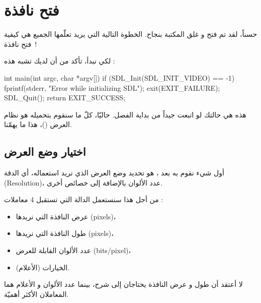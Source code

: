 \section{فتح نافذة}

حسناً، لقد تم فتح و غلق المكتبة بنجاح. الخطوة التالية التي يريد تعلّمها الجميع هي كيفية فتح نافذة~! 

لكي نبدأ، تأكد من أن لديك
تشبه هذه :

\begin{Csource}
int main(int argc, char *argv[])
{
	if (SDL_Init(SDL_INIT_VIDEO) == -1)
	{
		fprintf(stderr, "Error while initializing SDL");
		exit(EXIT_FAILURE);
	}
	SDL_Quit();
	return EXIT_SUCCESS;
}
\end{Csource}

هذه هي حالتك لو اتبعت جيداً من بداية الفصل. حاليّا، كلّ ما سنقوم بتحميله هو نظام العرض
()،
هذا ما يهمّنا.
\subsection{اختيار وضع العرض}

أول شيء نقوم به بعد 
،
هو تحديد وضع العرض الذي نريد استعماله، أي الدقة
(\textenglish{Resolution})،
عدد الألوان بالإضافة إلى خصائص أخرى.

من أجل هذا سنستعمل الدالة
التي تستقبل 4 معاملات :

\begin{itemize}
	\item عرض النافذة التي نريدها
	(\textenglish{pixels})،
	\item طول النافذة التي نريدها
	(\textenglish{pixels})،
	\item عدد الألوان القابلة للعرض
	(\textenglish{bits/pixel})،
	\item الخيارات (الأعلام).
\end{itemize}

لا أعتقد أن طول و عرض النافذة يحتاجان إلى شرح، بينما عدد الألوان و الأعلام هما المعاملان الأكثر أهميّة.

